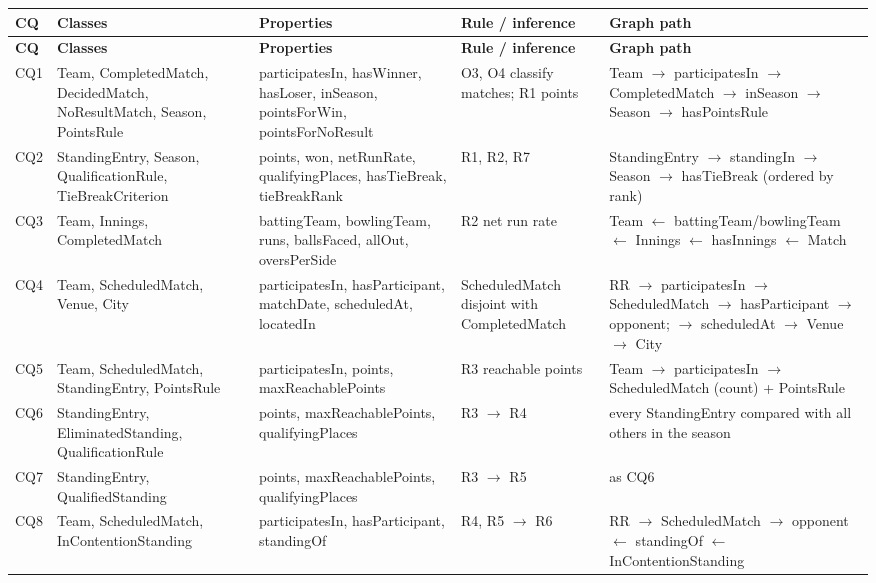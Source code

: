 {\scriptsize
\begin{longtable}{p{0.8cm}p{3.3cm}p{3.4cm}p{2.4cm}p{4.4cm}}
\toprule \textbf{CQ} & \textbf{Classes} & \textbf{Properties} & \textbf{Rule / inference} & \textbf{Graph path} \\ \midrule \endfirsthead
\toprule \textbf{CQ} & \textbf{Classes} & \textbf{Properties} & \textbf{Rule / inference} & \textbf{Graph path} \\ \midrule \endhead
CQ1 & Team, CompletedMatch, DecidedMatch, NoResultMatch, Season, PointsRule & participatesIn, hasWinner, hasLoser, inSeason, pointsForWin, pointsForNoResult & O3, O4 classify matches; R1 points & Team $\rightarrow$ participatesIn $\rightarrow$ CompletedMatch $\rightarrow$ inSeason $\rightarrow$ Season $\rightarrow$ hasPointsRule \\
CQ2 & StandingEntry, Season, QualificationRule, TieBreakCriterion & points, won, netRunRate, qualifyingPlaces, hasTieBreak, tieBreakRank & R1, R2, R7 & StandingEntry $\rightarrow$ standingIn $\rightarrow$ Season $\rightarrow$ hasTieBreak (ordered by rank) \\
CQ3 & Team, Innings, CompletedMatch & battingTeam, bowlingTeam, runs, ballsFaced, allOut, oversPerSide & R2 net run rate & Team $\leftarrow$ battingTeam/bowlingTeam $\leftarrow$ Innings $\leftarrow$ hasInnings $\leftarrow$ Match \\
CQ4 & Team, ScheduledMatch, Venue, City & participatesIn, hasParticipant, matchDate, scheduledAt, locatedIn & ScheduledMatch disjoint with CompletedMatch & RR $\rightarrow$ participatesIn $\rightarrow$ ScheduledMatch $\rightarrow$ hasParticipant $\rightarrow$ opponent; $\rightarrow$ scheduledAt $\rightarrow$ Venue $\rightarrow$ City \\
CQ5 & Team, ScheduledMatch, StandingEntry, PointsRule & participatesIn, points, maxReachablePoints & R3 reachable points & Team $\rightarrow$ participatesIn $\rightarrow$ ScheduledMatch (count) + PointsRule \\
CQ6 & StandingEntry, EliminatedStanding, QualificationRule & points, maxReachablePoints, qualifyingPlaces & R3 $\rightarrow$ R4 & every StandingEntry compared with all others in the season \\
CQ7 & StandingEntry, QualifiedStanding & points, maxReachablePoints, qualifyingPlaces & R3 $\rightarrow$ R5 & as CQ6 \\
CQ8 & Team, ScheduledMatch, InContentionStanding & participatesIn, hasParticipant, standingOf & R4, R5 $\rightarrow$ R6 & RR $\rightarrow$ ScheduledMatch $\rightarrow$ opponent $\leftarrow$ standingOf $\leftarrow$ InContentionStanding \\

\end{longtable}}
